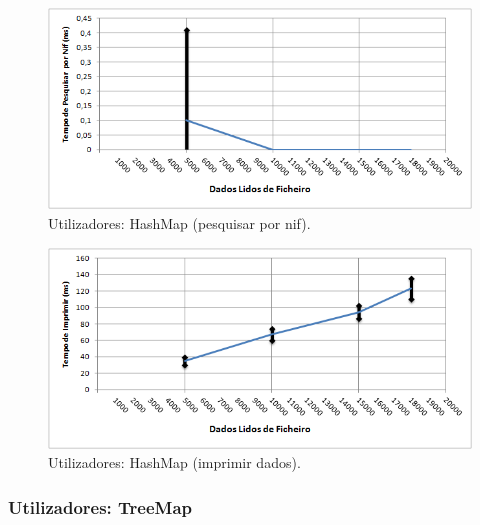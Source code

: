 \documentclass[a5paper,twocolumn, 11pt]{article}
\begin{document}
\begin{figure}[h!b!t!]
    \caption[Utilizadores: HashMap (pesquisar por nif)]{Utilizadores: HashMap (pesquisar por nif).}
    \label{hashtable}
    \centering
        \includegraphics[width=400pt]{user_c3_o4.png}
\end{figure}
\begin{figure}[h!b!t!]
    \caption[Utilizadores: HashMap (imprimir dados)]{Utilizadores: HashMap (imprimir dados).}
    \label{hashtable}
    \centering
        \includegraphics[width=400pt]{user_c3_o5.png}
\end{figure}

\newpage
\twocolumn
\subsubsection{Utilizadores: TreeMap}
\end{document}
